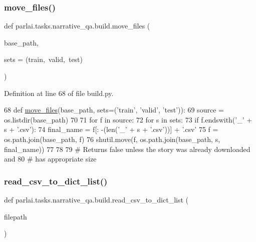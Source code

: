 \subsubsection{\texorpdfstring{move\+\_\+files()}{move\_files()}}
{\footnotesize\ttfamily def parlai.\+tasks.\+narrative\+\_\+qa.\+build.\+move\+\_\+files (\begin{DoxyParamCaption}\item[{}]{base\+\_\+path,  }\item[{}]{sets = {\ttfamily (\textquotesingle{}train\textquotesingle{},~\textquotesingle{}valid\textquotesingle{},~\textquotesingle{}test\textquotesingle{})} }\end{DoxyParamCaption})}



Definition at line 68 of file build.\+py.


\begin{DoxyCode}
68 \textcolor{keyword}{def }\hyperlink{namespaceparlai_1_1tasks_1_1narrative__qa_1_1build_a53e5ef8d085ebdfc1cc6c4918841d097}{move\_files}(base\_path, sets=(\textcolor{stringliteral}{'train'}, \textcolor{stringliteral}{'valid'}, \textcolor{stringliteral}{'test'})):
69     source = os.listdir(base\_path)
70 
71     \textcolor{keywordflow}{for} f \textcolor{keywordflow}{in} source:
72         \textcolor{keywordflow}{for} s \textcolor{keywordflow}{in} sets:
73             \textcolor{keywordflow}{if} f.endswith(\textcolor{stringliteral}{'\_'} + s + \textcolor{stringliteral}{'.csv'}):
74                 final\_name = f[: -(len(\textcolor{stringliteral}{'\_'} + s + \textcolor{stringliteral}{'.csv'}))] + \textcolor{stringliteral}{'.csv'}
75                 f = os.path.join(base\_path, f)
76                 shutil.move(f, os.path.join(base\_path, s, final\_name))
77 
78 
79 \textcolor{comment}{# Returns false unless the story was already downloaded and}
80 \textcolor{comment}{# has appropriate size}
\end{DoxyCode}
\mbox{\label{namespaceparlai_1_1tasks_1_1narrative__qa_1_1build_a7fae633ea705d970c2a6d56b7004f6cd}} 
\subsubsection{\texorpdfstring{read\+\_\+csv\+\_\+to\+\_\+dict\+\_\+list()}{read\_csv\_to\_dict\_list()}}
{\footnotesize\ttfamily def parlai.\+tasks.\+narrative\+\_\+qa.\+build.\+read\+\_\+csv\+\_\+to\+\_\+dict\+\_\+list (\begin{DoxyParamCaption}\item[{}]{filepath }\end{DoxyParamCaption})}



